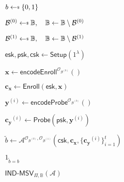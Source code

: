 \begin{figure}[h]
\centering

	\begin{minipage}[t]{0.55\textwidth}
	\begin{algorithm}[H]
	\caption{$\textsf{IND-MSV}_{\Pi, \mathbb{B}}(\mathcal{A})$}
	\label{alg:ind-msv_game}
	\begin{algorithmic}[1]
		\State $b \getsdollar \{0, 1\}$

		\State $\mathcal{B}^{(0)} \getsdollar \mathbb{B}, \quad \mathbb{B} \gets \mathbb{B} \setminus \mathcal{B}^{(0)}$

		\State $\mathcal{B}^{(1)} \getsdollar \mathbb{B}, \quad \mathbb{B} \gets \mathbb{B} \setminus \mathcal{B}^{(1)}$

		\State $\textsf{esk}, \textsf{psk}, \textsf{csk} \gets \textsf{Setup}(1^\lambda)$

		\State $\mathbf{x} \gets \textsf{encodeEnroll}^{\mathcal{O}_{\mathcal{B}^{(b)}}}()$

		\State $\mathbf{c_x} \gets \textsf{Enroll}(\textsf{esk}, \mathbf{x})$


			\State $\mathbf{y}^{(i)} \gets \textsf{encodeProbe}^{\mathcal{O}_{\mathcal{B}^{(b)}}}() $
		
			\State $\mathbf{c_y}^{(i)} \gets \textsf{Probe}( \textsf{psk}, \mathbf{y}^{(i)} )$

		\EndFor

		

		
			\State $\tilde{b} \gets \mathcal{A}^{\mathcal{O}_{\mathcal{B}^{(0)}}, \mathcal{O}_{\mathcal{B}^{(1)}}} ( \textsf{csk}, \mathbf{c_x}, \{ \mathbf{c_y}^{(i)} \}_{i=1}^t )$

		\State \Return $1_{\tilde{b} = b}$
	\end{algorithmic}
	\end{algorithm}
	\end{minipage}

\label{fig:ind-msv_game}
\end{figure}


